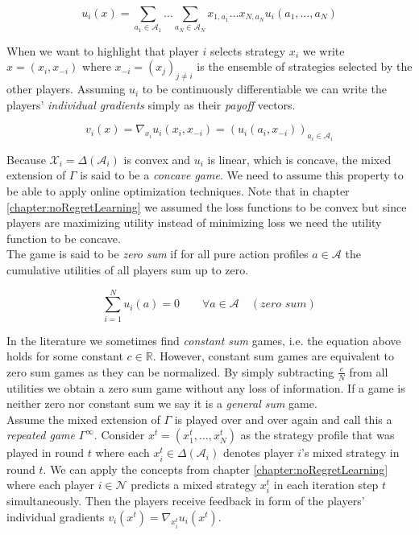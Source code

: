 \begin{equation*}
    u_i(x) = \sum_{a_1\in\mathcal{A}_1}\dots\sum_{a_N\in\mathcal{A}_N} x_{1,a_1} \dots x_{N,a_N}u_i(a_1,\dots,a_N)
\end{equation*}

When we want to highlight that player $i$ selects strategy $x_i$ we write $x = (x_i,x_{-i})$ where $x_{-i} = {(x_j)}_{j\neq i}$ is the ensemble of strategies selected by the other players. Assuming $u_i$ to be continuously differentiable we can write the players' \textit{individual gradients} simply as their \textit{payoff} vectors. 

\begin{equation*}
    v_i(x) = \nabla_{x_i}u_i(x_i,x_{-i}) = (u_i(a_i,x_{-i}))_{a_i\in\mathcal{A}_i}
\end{equation*}

Because $\mathcal{X}_i = \Delta(\mathcal{A}_i)$ is convex and $u_i$ is linear, which is concave, the mixed extension of $\Gamma$ is said to be a \textit{concave game}. We need to assume this property to be able to apply online optimization techniques. Note that in chapter \ref{chapter:noRegretLearning} we assumed the loss functions to be convex but since players are maximizing utility instead of minimizing loss we need the utility function to be concave. \\

The game is said to be \textit{zero sum} if for all pure action profiles $a \in \mathcal{A}$ the cumulative utilities of all players sum up to zero.  

\begin{equation*}
    \sum_{i = 1}^{N} u_i(a)= 0 \qquad \forall a \in \mathcal{A} \quad (\textit{zero sum})
\end{equation*}

In the literature we sometimes find \textit{constant sum} games, i.e. the equation above holds for some constant $c \in \mathbb{R}$. However, constant sum games are equivalent to zero sum games as they can be normalized. By simply subtracting $\frac{c}{N}$ from all utilities we obtain a zero sum game without any loss of information. If a game is neither zero nor constant sum we say it is a \textit{general sum} game.\\

Assume the mixed extension of $\Gamma$ is played over and over again and call this a \textit{repeated game} $\Gamma^{\infty}$. Consider $x^t = (x_{1}^{t},\dots,x_{N}^{t})$ as the strategy profile that was played in round $t$ where each $x_{i}^{t} \in \Delta(\mathcal{A}_i)$ denotes player $i$'s mixed strategy in round $t$. We can apply the concepts from chapter \ref{chapter:noRegretLearning} where each player $i \in \mathcal{N}$ predicts a mixed strategy $x_{i}^{t}$ in each iteration step $t$ simultaneously. Then the players receive feedback in form of the players' individual gradients $v_{i}(x^t) = \nabla_{x_{i}^{t}}u_{i}(x^t)$. \\

